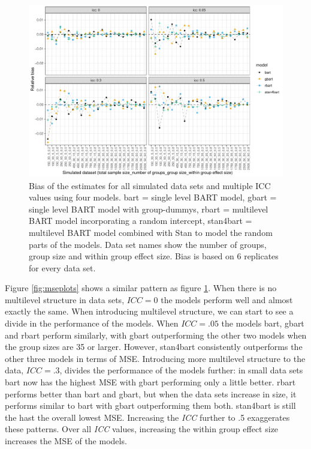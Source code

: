 \documentclass[10pt, a4paper, titlepage]{article}
\begin{document}
\begin{figure}[H]
\caption{Bias of the estimates for all simulated data sets and multiple ICC values using four models. bart = single level BART model, gbart = single level BART model with group-dummys, rbart = multilevel BART model incorporating a random intercept, stan4bart = multilevel BART model combined with Stan to model the random parts of the models. Data set names show the number of groups, group size and within group effect size. Bias is based on 6 replicates for every data set.}
\centering
\label{fig:biasplots}
\includegraphics[width=\textwidth]{biasplots3.pdf}
\end{figure}

Figure \ref{fig:mseplots} shows a similar pattern as figure \ref{fig:biasplots}. When there is no multilevel structure in data sets, $ICC = 0$ the models perform well and almost exactly the same. When introducing multilevel structure, we can start to see a divide in the performance of the models. When $ICC = .05$ the models bart, gbart and rbart perform similarly, with gbart outperforming the other two models when the group sizes are 35 or larger. However, stan4bart consistently outperforms the other three models in terms of MSE. Introducing more multilevel structure to the data, $ICC = .3$, divides the performance of the models further: in small data sets bart now has the highest MSE with gbart performing only a little better. rbart performs better than bart and gbart, but when the data sets increase in size, it performs similar to bart with gbart outperforming them both. stan4bart is still the hast the overall lowest MSE. Increasing the \textit{ICC} further to .5 exaggerates these patterns. Over all \textit{ICC} values, increasing the within group effect size increases the MSE of the models.
\end{document}
